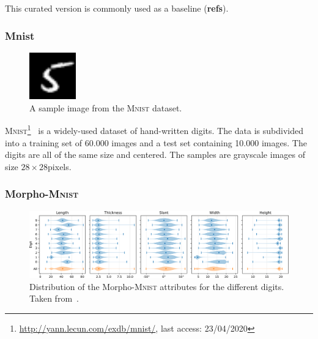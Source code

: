 This curated version is commonly used as a baseline (\textbf{refs}).

\subsubsection{Mnist}\label{subsubsec:mnist}

\begin{figure}
    \begin{center}
        \includegraphics[width=0.18\textwidth]{images/mnist_sample.png}
    \end{center}
    \caption[\textsc{Mnist} dataset sample image]{A sample image from the \textsc{Mnist} dataset.}
    \label{fig:mnist_sample}
\end{figure}

\textsc{Mnist}\footnote{\href{http://yann.lecun.com/exdb/mnist/}{http://yann.lecun.com/exdb/mnist/}, last access: 23/04/2020}~\citep{lecun1998gradient} is a widely-used dataset of hand-written digits.
The data is subdivided into a training set of 60.000 images and a test set containing 10.000 images.
The digits are all of the same size and centered.
The samples are grayscale images of size $28\times 28$pixels.

\subsubsection{Morpho-\textsc{Mnist}}\label{subsubsec:morphomnist}

\begin{figure}
    \centering
    \includegraphics[width=\textwidth]{images/morpho_mnist_distribution.png}
    \caption[Morpho-\textsc{Mnist} distribution]{Distribution of the Morpho-\textsc{Mnist} attributes for the different digits. Taken from~\citep{castro2019morpho}.}
    \label{fig:morpho_mnist_distribution}
\end{figure}

